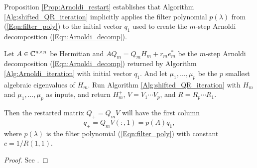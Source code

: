 Proposition \ref{Prop:Arnoldi_restart} establishes that Algorithm \ref{Alg:shifted_QR_iteration} implicitly applies the filter polynomial $p(\lambda)$ from (\ref{Eqn:filter_poly}) to the initial vector $q_1$ used to create the $m$-step Arnoldi decomposition (\ref{Eqn:Arnoldi_decomp}).

\begin{prop} 			\label{Prop:Arnoldi_restart}
Let $A \in {\mathbb C}^{n \times n}$ be Hermitian and $AQ_m = Q_mH_m + r_me_m^*$ be the $m$-step Arnoldi decomposition (\ref{Eqn:Arnoldi_decomp}) returned by Algorithm \ref{Alg:Arnoldi_iteration} with initial vector $q_1$.  And let $\mu_1, \ldots, \mu_p$ be the $p$ smallest algebraic eigenvalues of $H_m$.  Run Algorithm \ref{Alg:shifted_QR_iteration} with $H_m$ and $\mu_1, \ldots, \mu_p$ as inputs, and return $H_m^+$, $V = V_1 \cdots V_p$, and $R = R_p \cdots R_1$.

Then the restarted matrix $Q_+ = Q_mV$ will have the first column
\[
q_+ = Q_mV(:,1) = p(A)q_1,
\]
where $p(\lambda)$ is the filter polynomial (\ref{Eqn:filter_poly}) with constant $c = 1/R(1,1)$.
\end{prop}


\begin{proof}
See \cite[Section 10.5.3]{golub2012matrix}.
\end{proof}


\iffalse

